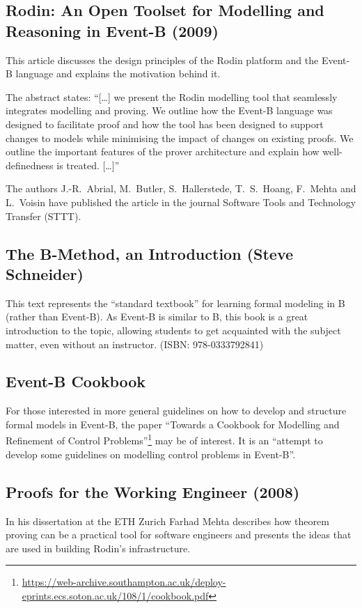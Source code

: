 \documentclass[twoside,10pt]{book}
\begin{document}
\subsection{Rodin: An Open Toolset for Modelling and Reasoning in Event-B (2009)}
\label{abrialBHHMV_2009}

This article discusses the design principles of the Rodin platform and the Event-B language and 
explains the motivation behind it.

The abstract states: ``[\ldots] we present the Rodin modelling tool that seamlessly integrates modelling and proving. 
 We outline how the Event-B language was designed to facilitate proof and how the tool has been designed to support changes to 
 models while minimising the impact of changes on existing proofs. 
 We outline the important features of the prover architecture and explain how well-definedness is treated. [\ldots]''

The authors J.-R.~Abrial, M.~Butler, S.~Hallerstede, T.~S.~Hoang, F.~Mehta and L.~Voisin have published the article in the journal Software Tools and Technology Transfer (STTT).

\subsection{The B-Method, an Introduction (Steve Schneider)}
\label{schneider_book}

This text represents the ``standard textbook'' for learning formal modeling in B (rather than Event-B).  As Event-B is similar to B, this book is a great introduction to the topic, allowing students to get acquainted with the subject matter, even without an instructor. (ISBN: 978-0333792841)

\subsection{Event-B Cookbook}

For those interested in more general guidelines on how to develop and structure formal models in Event-B, the paper ``Towards a Cookbook for Modelling and Refinement of Control Problems''\footnote{\url{https://web-archive.southampton.ac.uk/deploy-eprints.ecs.soton.ac.uk/108/1/cookbook.pdf}} may be of interest.  It is an ``attempt to develop some guidelines on modelling control problems in Event-B''.

\subsection{Proofs for the Working Engineer (2008)}
In his dissertation at the ETH Zurich Farhad Mehta describes how theorem proving
can be a practical tool for software engineers and presents the ideas that are used
in building Rodin's infrastructure.
\end{document}
